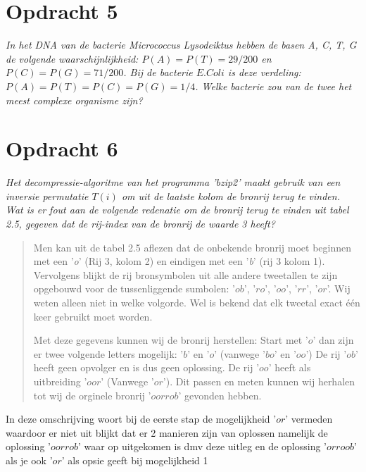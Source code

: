 \section{Opdracht 5}
\emph{In het DNA van de bacterie \emph{Micrococcus Lysodeiktus} hebben de basen \emph{A, C, T, G} de volgende waarschijnlijkheid: $P(A)=P(T)=29/200$ en $P(C)=P(G)=71/200$. Bij de bacterie $E. Coli$ is deze verdeling: $P(A)=P(T)=P(C)=P(G)=1/4$. Welke bacterie zou van de twee het meest complexe organisme zijn?}

\section{Opdracht 6}
\emph{Het decompressie-algoritme van het programma '\emph{bzip2}' maakt gebruik van een inversie permutatie $T(i)$ om uit de laatste kolom de bronrij terug te vinden. Wat is er fout aan de volgende redenatie om de bronrij terug te vinden uit tabel 2.5, gegeven dat de rij-index van de bronrij de waarde 3 heeft?}

\begin{quote}
Men kan uit de tabel 2.5 aflezen dat de onbekende bronrij moet beginnen met een '\emph{o}' (Rij 3, kolom 2) en eindigen met een '\emph{b}' (rij 3 kolom 1). Vervolgens blijkt de rij bronsymbolen uit alle andere tweetallen te zijn opgebouwd voor de tussenliggende sumbolen: '$ob$', '$ro$', '$oo$', '$rr$', '$or$'. Wij weten alleen niet in welke volgorde. Wel is bekend dat elk tweetal exact \'{e}\'{e}n keer gebruikt moet worden.

Met deze gegevens kunnen wij de bronrij herstellen: Start met '$o$' dan zijn er twee volgende letters mogelijk: '$b$' en '$o$' (vanwege '$bo$' en '$oo$') De rij '$ob$' heeft geen opvolger en is dus geen oplossing. De rij '$oo$' heeft als uitbreiding '$oor$' (Vanwege '$or$'). Dit passen en meten kunnen wij herhalen tot wij de orginele bronrij '$oorrob$' gevonden hebben.
\end{quote}
In deze omschrijving woort bij de eerste stap de mogelijkheid '$or$' vermeden waardoor er niet uit blijkt dat er 2 manieren zijn van oplossen namelijk de oplossing '$oorrob$' waar op uitgekomen is dmv deze uitleg en de oplossing '$orroob$' als je ook '$or$' als opsie geeft bij mogelijkheid 1


